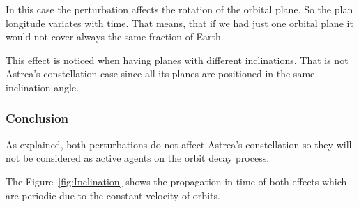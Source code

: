 In this case the perturbation affects the rotation of the orbital plane. So the plan longitude variates with time. That means, that if we had just one orbital plane it would not cover always the same fraction of Earth.

This effect is noticed when having planes with different inclinations. That is not Astrea's constellation case since all its planes are positioned in the same inclination angle.

\subsubsection{Conclusion}

As explained, both perturbations do not affect Astrea's constellation so they will not be considered as active agents on the orbit decay process.

The Figure~\ref{fig:Inclination} shows the propagation in time of both effects which are periodic due to the constant velocity  of orbits.